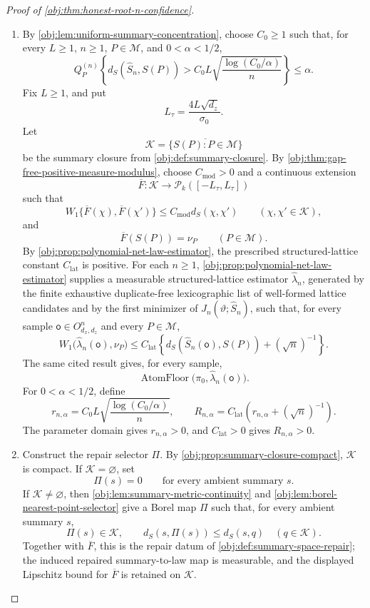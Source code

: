 \begin{proof}[Proof of \cref{obj:thm:honest-root-n-confidence}]
\begin{enumerate}
\item By \cref{obj:lem:uniform-summary-concentration}, choose \(C_0\ge1\) such that, for every \(L\ge1\), \(n\ge1\), \(P\in\mathcal M\), and \(0<\alpha<1/2\),
\[
Q_P^{(n)}
\left\{
d_S(\widehat S_n,S(P))>
C_0L\sqrt{\frac{\log(C_0/\alpha)}{n}}
\right\}
\le \alpha .
\]
Fix \(L\ge1\), and put
\[
L_\tau=\frac{4L\sqrt{d_z}}{\sigma_0}.
\]
Let
\[
\mathcal K=\overline{\{S(P):P\in\mathcal M\}}
\]
be the summary closure from \cref{obj:def:summary-closure}.  By \cref{obj:thm:gap-free-positive-measure-modulus}, choose \(C_{\mathrm{mod}}>0\) and a continuous extension
\[
\overline F:\mathcal K\to \mathcal P_k([-L_\tau,L_\tau])
\]
such that
\[
W_1\{\overline F(\chi),\overline F(\chi')\}
\le C_{\mathrm{mod}}d_S(\chi,\chi')
\qquad(\chi,\chi'\in\mathcal K),
\]
and
\[
\overline F(S(P))=\nu_P
\qquad(P\in\mathcal M).
\]
By \cref{obj:prop:polynomial-net-law-estimator}, the prescribed structured-lattice constant \(C_{\mathrm{lat}}\) is positive.  For each \(n\ge1\), \cref{obj:prop:polynomial-net-law-estimator} supplies a measurable structured-lattice estimator \(\widehat\lambda_n\), generated by the finite exhaustive duplicate-free lexicographic list of well-formed lattice candidates and by the first minimizer of \(J_n(\vartheta;\widehat S_n)\), such that, for every sample \(\mathsf o\in O_{d_x,d_z}^{n}\) and every \(P\in\mathcal M\),
\[
W_1\bigl(\widehat\lambda_n(\mathsf o),\nu_P\bigr)
\le
C_{\mathrm{lat}}
\left\{
d_S(\widehat S_n(\mathsf o),S(P))+(\sqrt n)^{-1}
\right\}.
\]
The same cited result gives, for every sample,
\[
\operatorname{AtomFloor}\bigl(\pi_0,\widehat\lambda_n(\mathsf o)\bigr).
\]
For \(0<\alpha<1/2\), define
\[
r_{n,\alpha}
=
C_0L\sqrt{\frac{\log(C_0/\alpha)}{n}},
\qquad
R_{n,\alpha}
=
C_{\mathrm{lat}}\left(r_{n,\alpha}+(\sqrt n)^{-1}\right).
\]
The parameter domain gives \(r_{n,\alpha}>0\), and \(C_{\mathrm{lat}}>0\) gives \(R_{n,\alpha}>0\).  %

\item Construct the repair selector \(\Pi\).  By \cref{obj:prop:summary-closure-compact}, \(\mathcal K\) is compact.  If \(\mathcal K=\varnothing\), set
\[
\Pi(s)=0
\qquad\text{for every ambient summary }s.
\]
If \(\mathcal K\ne\varnothing\), then \cref{obj:lem:summary-metric-continuity} and \cref{obj:lem:borel-nearest-point-selector} give a Borel map \(\Pi\) such that, for every ambient summary \(s\),
\[
\Pi(s)\in\mathcal K,
\qquad
d_S(s,\Pi(s))\le d_S(s,q)\quad(q\in\mathcal K).
\]
Together with \(\overline F\), this is the repair datum of \cref{obj:def:summary-space-repair}; the induced repaired summary-to-law map is measurable, and the displayed Lipschitz bound for \(\overline F\) is retained on \(\mathcal K\).  %


\end{enumerate}
\end{proof}

